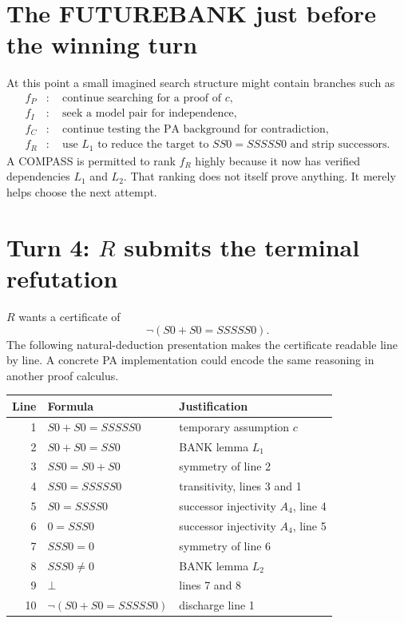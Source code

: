 \documentclass[11pt,openany]{book}
\theoremstyle{definition}
\theoremstyle{remark}
\begin{document}
\section{The FUTUREBANK just before the winning turn}
At this point a small imagined search structure might contain branches such as
\begin{align*}
f_P&:\quad \text{continue searching for a proof of }c,\\
f_I&:\quad \text{seek a model pair for independence},\\
f_C&:\quad \text{continue testing the PA background for contradiction},\\
f_R&:\quad \text{use }L_1\text{ to reduce the target to }SS0=SSSSS0\text{ and strip successors}.
\end{align*}
A COMPASS is permitted to rank $f_R$ highly because it now has verified dependencies $L_1$ and $L_2$. That ranking does not itself prove anything. It merely helps choose the next attempt.

\section{Turn 4: \texorpdfstring{$R$}{R} submits the terminal refutation}
$R$ wants a certificate of
\[
\neg(S0+S0=SSSSS0).
\]
The following natural-deduction presentation makes the certificate readable line by line. A concrete PA implementation could encode the same reasoning in another proof calculus.

\begin{center}
\begin{tabularx}{0.94\textwidth}{@{}rXl@{}}
\toprule
\textbf{Line} & \textbf{Formula} & \textbf{Justification}\\
\midrule
1 & $S0+S0=SSSSS0$ & temporary assumption $c$\\
2 & $S0+S0=SS0$ & BANK lemma $L_1$\\
3 & $SS0=S0+S0$ & symmetry of line 2\\
4 & $SS0=SSSSS0$ & transitivity, lines 3 and 1\\
5 & $S0=SSSS0$ & successor injectivity $A_4$, line 4\\
6 & $0=SSS0$ & successor injectivity $A_4$, line 5\\
7 & $SSS0=0$ & symmetry of line 6\\
8 & $SSS0\neq0$ & BANK lemma $L_2$\\
9 & $\bot$ & lines 7 and 8\\
10 & $\neg(S0+S0=SSSSS0)$ & discharge line 1\\
\bottomrule
\end{tabularx}
\end{center}
\end{document}
